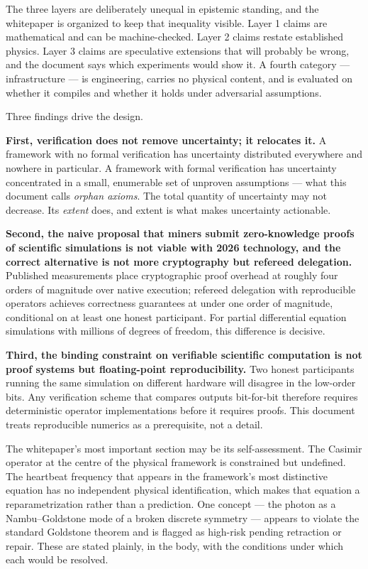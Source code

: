 \documentclass[
  11pt]{report}
\begin{document}
The three layers are deliberately unequal in epistemic standing, and the
whitepaper is organized to keep that inequality visible. Layer 1 claims
are mathematical and can be machine-checked. Layer 2 claims restate
established physics. Layer 3 claims are speculative extensions that will
probably be wrong, and the document says which experiments would show
it. A fourth category --- infrastructure --- is engineering, carries no
physical content, and is evaluated on whether it compiles and whether it
holds under adversarial assumptions.

Three findings drive the design.

\textbf{First, verification does not remove uncertainty; it relocates
it.} A framework with no formal verification has uncertainty distributed
everywhere and nowhere in particular. A framework with formal
verification has uncertainty concentrated in a small, enumerable set of
unproven assumptions --- what this document calls \emph{orphan axioms}.
The total quantity of uncertainty may not decrease. Its \emph{extent}
does, and extent is what makes uncertainty actionable.

\textbf{Second, the naive proposal that miners submit zero-knowledge
proofs of scientific simulations is not viable with 2026 technology, and
the correct alternative is not more cryptography but refereed
delegation.} Published measurements place cryptographic proof overhead
at roughly four orders of magnitude over native execution; refereed
delegation with reproducible operators achieves correctness guarantees
at under one order of magnitude, conditional on at least one honest
participant. For partial differential equation simulations with millions
of degrees of freedom, this difference is decisive.

\textbf{Third, the binding constraint on verifiable scientific
computation is not proof systems but floating-point reproducibility.}
Two honest participants running the same simulation on different
hardware will disagree in the low-order bits. Any verification scheme
that compares outputs bit-for-bit therefore requires deterministic
operator implementations before it requires proofs. This document treats
reproducible numerics as a prerequisite, not a detail.

The whitepaper's most important section may be its self-assessment. The
Casimir operator at the centre of the physical framework is constrained
but undefined. The heartbeat frequency that appears in the framework's
most distinctive equation has no independent physical identification,
which makes that equation a reparametrization rather than a prediction.
One concept --- the photon as a Nambu--Goldstone mode of a broken
discrete symmetry --- appears to violate the standard Goldstone theorem
and is flagged as high-risk pending retraction or repair. These are
stated plainly, in the body, with the conditions under which each would
be resolved.
\end{document}

